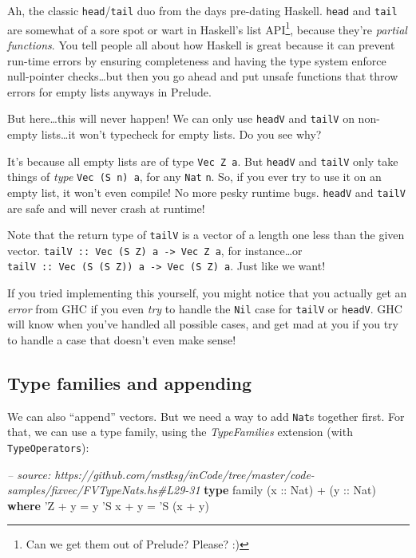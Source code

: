 \documentclass[]{article}
\newenvironment{Shaded}{}{}
\newcommand{\KeywordTok}[1]{\textcolor[rgb]{0.00,0.44,0.13}{\textbf{{#1}}}}
\newcommand{\DataTypeTok}[1]{\textcolor[rgb]{0.56,0.13,0.00}{{#1}}}
\newcommand{\CharTok}[1]{\textcolor[rgb]{0.25,0.44,0.63}{{#1}}}
\newcommand{\CommentTok}[1]{\textcolor[rgb]{0.38,0.63,0.69}{\textit{{#1}}}}
\newcommand{\OtherTok}[1]{\textcolor[rgb]{0.00,0.44,0.13}{{#1}}}
\newcommand{\FunctionTok}[1]{\textcolor[rgb]{0.02,0.16,0.49}{{#1}}}
\newcommand{\NormalTok}[1]{{#1}}
\begin{document}
Ah, the classic \texttt{head}/\texttt{tail} duo from the days pre-dating
Haskell. \texttt{head} and \texttt{tail} are somewhat of a sore spot or
wart in Haskell's list API\footnote{Can we get them out of Prelude?
  Please? :)}, because they're \emph{partial functions}. You tell people
all about how Haskell is great because it can prevent run-time errors by
ensuring completeness and having the type system enforce null-pointer
checks\ldots{}but then you go ahead and put unsafe functions that throw
errors for empty lists anyways in Prelude.

But here\ldots{}this will never happen! We can only use \texttt{headV}
and \texttt{tailV} on non-empty lists\ldots{}it won't typecheck for
empty lists. Do you see why?

It's because all empty lists are of type \texttt{Vec\ Z\ a}. But
\texttt{headV} and \texttt{tailV} only take things of \emph{type}
\texttt{Vec\ (S\ n)\ a}, for any \texttt{Nat} \texttt{n}. So, if you
ever try to use it on an empty list, it won't even compile! No more
pesky runtime bugs. \texttt{headV} and \texttt{tailV} are safe and will
never crash at runtime!

Note that the return type of \texttt{tailV} is a vector of a length one
less than the given vector.
\texttt{tailV\ ::\ Vec\ (S\ Z)\ a\ -\textgreater{}\ Vec\ Z\ a}, for
instance\ldots{}or
\texttt{tailV\ ::\ Vec\ (S\ (S\ Z))\ a\ -\textgreater{}\ Vec\ (S\ Z)\ a}.
Just like we want!

If you tried implementing this yourself, you might notice that you
actually get an \emph{error} from GHC if you even \emph{try} to handle
the \texttt{Nil} case for \texttt{tailV} or \texttt{headV}. GHC will
know when you've handled all possible cases, and get mad at you if you
try to handle a case that doesn't even make sense!

\subsection{Type families and
appending}\label{type-families-and-appending}

We can also ``append'' vectors. But we need a way to add \texttt{Nat}s
together first. For that, we can use a type family, using the
\emph{TypeFamilies} extension (with \texttt{TypeOperators}):

\begin{Shaded}
\begin{Highlighting}[]
\CommentTok{-- source: https://github.com/mstksg/inCode/tree/master/code-samples/fixvec/FVTypeNats.hs#L29-31}
\KeywordTok{type} \NormalTok{family (}\OtherTok{x ::} \DataTypeTok{Nat}\NormalTok{) }\FunctionTok{+} \NormalTok{(}\OtherTok{y ::} \DataTypeTok{Nat}\NormalTok{) }\KeywordTok{where}
    \CharTok{'Z   + y = y}
    \CharTok{'S x + y = '}\DataTypeTok{S} \NormalTok{(x }\FunctionTok{+} \NormalTok{y)}
\end{Highlighting}
\end{Shaded}
\end{document}

